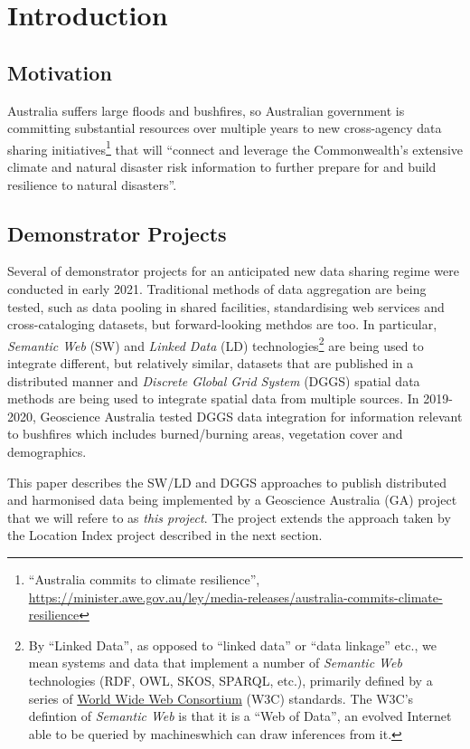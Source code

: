\documentclass[runningheads]{llncs}
\begin{document}
\section{Introduction}\label{sec:introduction}
\subsection{Motivation}
Australia suffers large floods and bushfires, so Australian government is committing substantial resources over 
multiple years to new cross-agency data sharing initiatives\footnote{``Australia commits to climate resilience'', 
\url{https://minister.awe.gov.au/ley/media-releases/australia-commits-climate-resilience}}
that will ``connect and leverage the Commonwealth’s extensive climate and natural disaster risk information to further prepare for and build resilience to natural disasters''.

\subsection{Demonstrator Projects}
Several of demonstrator projects for an anticipated new data sharing regime were conducted in early 2021. 
Traditional methods of data aggregation are being tested, such as data pooling in shared facilities,
standardising web services and cross-cataloging datasets, but forward-looking methdos are too. In particular,
\textit{Semantic Web} (SW) and \textit{Linked Data} (LD) technologies\footnote{By ``Linked Data'', as opposed to ``linked data'' or ``data linkage'' etc.,
we mean systems and data that implement a number of \textit{Semantic Web} technologies (RDF, OWL, SKOS, SPARQL, etc.), primarily 
defined by a series of \href{https://www.w3.org/standards/semanticweb/data}{World Wide Web Consortium} (W3C) standards. The W3C's defintion of 
\textit{Semantic Web} is that it is a ``Web of Data'', an evolved Internet able to be queried by machineswhich can draw inferences from it.}
are being used to integrate different, but relatively similar, datasets that are published in a distributed manner and
\textit{Discrete Global Grid System} (DGGS) spatial data methods are being used to integrate spatial data from multiple sources. In 2019-2020, Geoscience Australia tested DGGS data integration
for information relevant to bushfires which includes burned/burning areas, vegetation cover and demographics.

This paper describes the SW/LD and DGGS approaches to publish distributed and harmonised data being implemented by a Geoscience Australia (GA) project that we will 
refere to as \textit{this project}. The project extends the approach taken by the Location Index project described in the next section.
\end{document}

